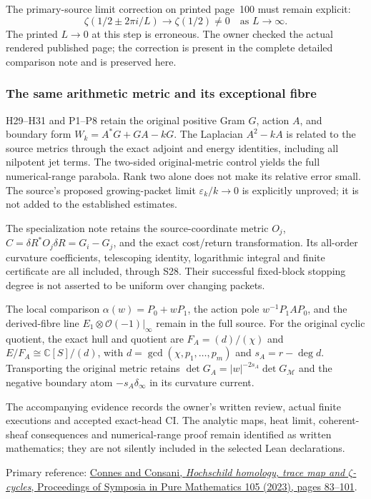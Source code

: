 The primary-source limit correction on printed page~100 must
remain explicit:
\[
 \zeta(1/2\pm2\pi i/L)\longrightarrow\zeta(1/2)\ne0
 \quad\text{as }L\longrightarrow\infty.
\]
The printed $L\to0$ at this step is erroneous. The owner checked
the actual rendered published page; the correction is present in
the complete detailed comparison note and is preserved here.

\subsubsection{The same arithmetic metric and its exceptional fibre}

H29--H31 and P1--P8 retain the original positive Gram $G$, action
$A$, and boundary form $W_k=A^*G+GA-kG$. The Laplacian
$A^2-kA$ is related to the source metrics through the exact
adjoint and energy identities, including all nilpotent jet terms.
The two-sided original-metric control yields the full numerical-range
parabola. Rank two alone does not make its relative error small.
The source's proposed growing-packet limit $\varepsilon_k/k\to0$
is explicitly unproved; it is not added to the established estimates.

The specialization note retains the source-coordinate metric
$O_j$, $C=\delta R^*O_j\delta R=G_i-G_j$, and the exact
cost/return transformation. Its all-order curvature coefficients,
telescoping identity, logarithmic integral and finite certificate
are all included, through S28. Their successful fixed-block stopping
degree is not asserted to be uniform over changing packets.

The local comparison $\alpha(w)=P_0+wP_1$, the action pole
$w^{-1}P_1AP_0$, and the derived-fibre line
$E_1\otimes\mathcal O(-1)|_\infty$ remain in the full source.
For the original cyclic quotient, the exact hull and quotient are
$F_A=(d)/(\chi)$ and $E/F_A\cong\mathbb C[S]/(d)$, with
$d=\gcd(\chi,p_1,\ldots,p_m)$ and $s_A=r-\deg d$.
Transporting the original metric retains
$\det G_A=|w|^{-2s_A}\det G_{\mathscr M}$ and the negative
boundary atom $-s_A\delta_\infty$ in its curvature current.

The accompanying evidence records the owner's written review,
actual finite executions and accepted exact-head CI. The analytic
maps, heat limit, coherent-sheaf consequences and numerical-range
proof remain identified as written mathematics; they are not
silently included in the selected Lean declarations.

Primary reference:
\href{https://doi.org/10.1090/pspum/105/01896}
{Connes and Consani, \emph{Hochschild homology, trace map and
$\zeta$-cycles}, Proceedings of Symposia in Pure Mathematics 105
(2023), pages 83--101}.


\endgroup

